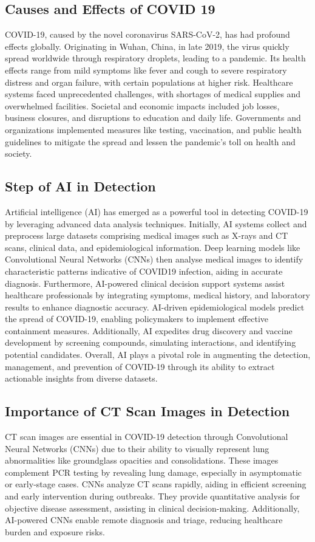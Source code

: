 \documentclass[12pt, a4paper]{report}
\begin{document}
\subsection{Causes and Effects of COVID 19}
COVID-19, caused by the novel coronavirus SARS-CoV-2, has had profound effects
globally. Originating in Wuhan, China, in late 2019, the virus quickly spread worldwide through respiratory droplets, leading to a pandemic. Its health effects range from mild symptoms like fever and cough to severe respiratory distress and organ failure, with certain populations at higher risk. Healthcare systems faced unprecedented challenges, with shortages of medical supplies and overwhelmed facilities. Societal and economic impacts included job losses, business closures, and disruptions to education and daily life.
Governments and organizations implemented measures like testing, vaccination, and public health guidelines to mitigate the spread and lessen the pandemic's toll on health and society.

\subsection{Step of AI in Detection}

Artificial intelligence (AI) has emerged as a powerful tool in detecting COVID-19 by leveraging advanced data analysis techniques. Initially, AI systems collect and preprocess large datasets comprising medical images such as X-rays and CT scans, clinical data, and epidemiological information. Deep learning models like Convolutional Neural Networks (CNNs) then analyse medical images to identify characteristic patterns indicative of COVID19 infection, aiding in accurate diagnosis. Furthermore, AI-powered clinical decision support systems assist healthcare professionals by integrating symptoms, medical history, and laboratory results to enhance diagnostic accuracy. AI-driven epidemiological models predict the spread of COVID-19, enabling policymakers to implement effective containment measures. Additionally, AI expedites drug discovery and vaccine development by screening
compounds, simulating interactions, and identifying potential candidates. Overall, AI plays a pivotal role in augmenting the detection, management, and prevention of COVID-19 through its ability to extract actionable insights from diverse datasets.

\subsection{Importance of CT Scan Images in Detection}
CT scan images are essential in COVID-19 detection through Convolutional Neural Networks (CNNs) due to their ability to visually represent lung abnormalities like groundglass opacities and consolidations. These images complement PCR testing by revealing lung damage, especially in asymptomatic or early-stage cases. CNNs analyze CT scans rapidly, aiding in efficient screening and early intervention during outbreaks. They provide quantitative analysis for objective disease assessment, assisting in clinical decision-making. Additionally, AI-powered CNNs enable remote diagnosis and triage, reducing healthcare burden and exposure risks.
\end{document}
